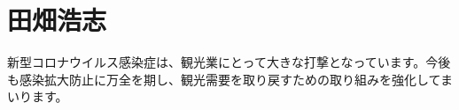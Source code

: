 \documentclass[10pt]{utarticle}
\begin{document}
\begin{minipage}{1.5in}
\section*{田畑浩志}
新型コロナウイルス感染症は、観光業にとって大きな打撃となっています。今後も感染拡大防止に万全を期し、観光需要を取り戻すための取り組みを強化してまいります。
\end{minipage}
\end{document}
